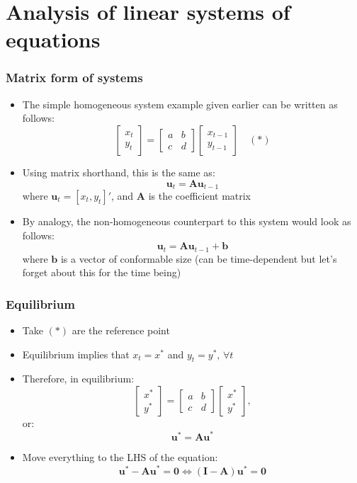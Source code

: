 \documentclass[10pt,usenames,dvipsnames]{beamer}
\theoremstyle{plain}
\theoremstyle{definition}
\begin{document}
\section{Analysis of linear systems of equations}
\begin{frame}[fragile]
\frametitle{Matrix form of systems}
\begin{itemize}
	\item The simple homogeneous system example given earlier can be written as follows:
	\[
		\left[\begin{matrix}
			x_{t}\\
			y_{t}
		\end{matrix}\right] = 
		\left[\begin{matrix}
			a & b \\
			c & d
		\end{matrix}\right]
		\left[\begin{matrix}
			x_{t-1}\\
			y_{t-1}
		\end{matrix}\right] \quad (*)
	\]
	\item Using matrix shorthand, this is the same as:
	\[
		\mathbf{u}_{t} = \mathbf{Au}_{t-1}
	\]
	where $\mathbf{u}_{t} = [x_{t},y_{t}]'$, and $\mathbf{A}$ is the coefficient matrix
	\item By analogy, the non-homogeneous counterpart to this system would look as follows:
	\[
		\mathbf{u}_{t} = \mathbf{Au}_{t-1} + \mathbf{b}
	\]
	where $\mathbf{b}$ is a vector of conformable size (can be time-dependent but let's forget about this for the time being)
\end{itemize}
\end{frame}

\begin{frame}[fragile]
\frametitle{Equilibrium}
\begin{itemize}
	\item Take $(*)$ are the reference point
	\item Equilibrium implies that $x_{t} = x^{*}$ and $y_{t} = y^{*},\, \forall t$
	\item Therefore, in equilibrium:
	\[
		\left[\begin{matrix}
			x^{*}\\
			y^{*}
		\end{matrix}\right] = 
		\left[\begin{matrix}
			a & b \\
			c & d
		\end{matrix}\right]
		\left[\begin{matrix}
			x^{*}\\
			y^{*}
		\end{matrix}\right],
	\]
	or:
	\[
		\mathbf{u}^{*} = \mathbf{Au}^{*}
	\]
	\item Move everything to the LHS of the equation:
	\[
		\mathbf{u}^{*} - \mathbf{Au}^{*} = \mathbf{0} \Leftrightarrow ( \mathbf{I-A})\mathbf{u}^{*} = \mathbf{0}
	\]
\end{itemize}
\end{frame}
\end{document}

